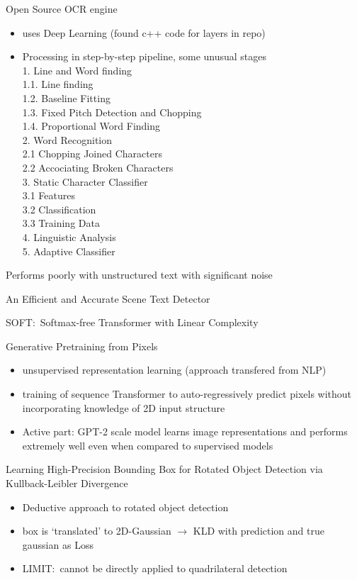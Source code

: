 Open Source OCR engine~\citep{smith_overview_2007}
\begin{itemize}
    \item uses Deep Learning (found c++ code for layers in repo)
    \item Processing in step-by-step pipeline, some unusual stages\\
        1. Line and Word finding\\
        1.1. Line finding\\
        1.2. Baseline Fitting\\
        1.3. Fixed Pitch Detection and Chopping\\
        1.4. Proportional Word Finding\\
        2. Word Recognition\\
        2.1 Chopping Joined Characters\\
        2.2 Accociating Broken Characters\\
        3. Static Character Classifier\\
        3.1 Features\\
        3.2 Classification\\
        3.3 Training Data\\
        4. Linguistic Analysis\\
        5. Adaptive Classifier
\end{itemize}
Performs poorly with unstructured text with significant noise

An Efficient and Accurate Scene Text Detector~\citep{zhou_east_2017}

SOFT:\ Softmax-free Transformer with Linear Complexity~\citep{lu_soft_2021}

Generative Pretraining from Pixels~\citep{chen_generative_2021}
\begin{itemize}
    \item unsupervised representation learning (approach transfered from NLP)
    \item training of sequence Transformer to auto-regressively predict pixels without incorporating
        knowledge of 2D input structure
    \item Active part: GPT-2 scale model learns image representations and performs extremely well even
        when compared to supervised models
\end{itemize}

Learning High-Precision Bounding Box for Rotated Object Detection via Kullback-Leibler
Divergence~\citep{yang_learning_2021}
\begin{itemize}
    \item Deductive approach to rotated object detection
    \item box is `translated' to 2D-Gaussian $\rightarrow$ KLD with prediction and true gaussian as Loss
    \item LIMIT:\ cannot be directly applied to quadrilateral detection
\end{itemize}


